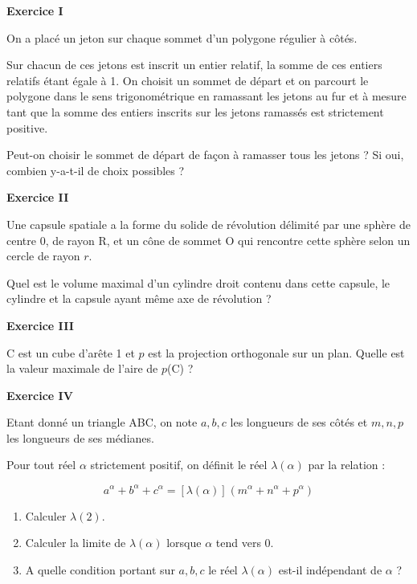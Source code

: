 \documentclass[a4paper,11pt]{article}
\begin{document}
\begin{center}\textbf{{\color{blue} Exercice I}}
\end{center}

On a placé un jeton sur chaque sommet d'un polygone régulier à  côtés. 

Sur chacun de ces jetons est inscrit un entier relatif, la somme de ces entiers relatifs étant égale à 1. On choisit un sommet de départ et on parcourt le polygone dans le sens trigonométrique en ramassant les jetons au fur et à mesure tant que la somme des entiers inscrits sur les jetons ramassés est strictement positive.

Peut-on choisir le sommet de départ de façon à ramasser tous les jetons ? Si oui, combien y-a-t-il de choix possibles ?

\begin{center}\textbf{{\color{blue} Exercice II}}
\end{center}

Une capsule spatiale a la forme du solide de révolution délimité par une sphère de centre 0, de rayon R, et un cône de sommet O qui rencontre cette sphère selon un cercle de rayon $r$.

Quel est le volume maximal d'un cylindre droit contenu dans cette capsule, le cylindre et la capsule ayant même axe de révolution ?

\begin{center}\textbf{{\color{blue} Exercice III}}
\end{center}

C est un cube d'arête 1 et $p$ est la projection orthogonale sur un plan. Quelle est la
valeur maximale de l'aire de $p$(C) ?

\begin{center}\textbf{{\color{blue} Exercice IV}}
\end{center}

Etant donné un triangle ABC, on note $a, b, c$ les longueurs de ses côtés et $m, n, p$ les longueurs de ses médianes. 

Pour tout réel $\alpha$ strictement positif, on définit le réel $\lambda(\alpha)$ par la relation :

\[a^{\alpha} + b^{\alpha} + c^{\alpha} = [\lambda(\alpha)]^{}\left(m^{\alpha} + n^{\alpha} + p^{\alpha} \right)\]

\begin{enumerate}
\item Calculer $\lambda(2)$.
\item Calculer la limite de $\lambda(\alpha)$ lorsque $\alpha$ tend vers $0$.
\item A quelle condition portant sur $a, b, c$ le réel $\lambda(\alpha)$ est-il indépendant de $\alpha$ ?
\end{enumerate}
\end{document}

